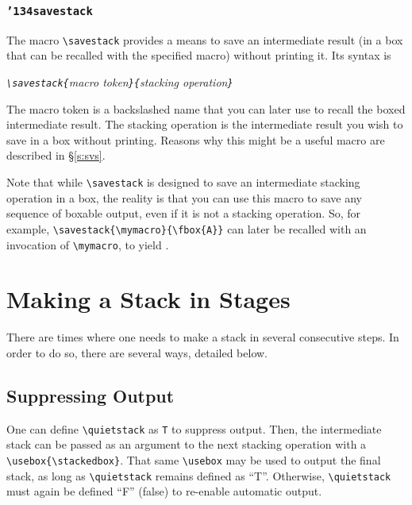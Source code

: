 \documentclass{article}
\let\vb\verb
\newcommand\cmd[1]{\texttt{\char'134#1}}
\begin{document}
{\centering{}\par}

\hsmash{\rule{5ex}{1ex}}\hfill\hsmash{\rule{2ex}{0ex}\rule{5em}{1ex}}

\subsubsection{\cmd{savestack}\label{s:ss}}

The macro \vb|\savestack| provides a means to save an intermediate
result (in a box that can be recalled with the specified macro) without
printing it.  Its syntax is

\itshape
\vb|\savestack{|macro token\vb|}{|stacking operation\vb|}|
\upshape

The macro token is a backslashed name that you can later use to recall
the boxed intermediate result.  The stacking operation is the
intermediate result you wish to save in a box without printing.  Reasons
why this might be a useful macro are described in \S\ref{s:svs}.

Note that while \vb|\savestack| is designed to save an intermediate
stacking operation in a box, the reality is that you can use this macro
to save any sequence of boxable output, even if it is not a stacking
operation.  So, for example, \vb|\savestack{\mymacro}{\fbox{A}}| can
later be recalled with an invocation of \vb|\mymacro|, to yield
\fboxsep=1pt\mymacro.\fboxsep=0pt

\section{Making a Stack in Stages}

There are times where one needs to make a stack in several consecutive
steps.  In order to do so, there are several ways, detailed below.  

\subsection{Suppressing Output\label{s:qs}}

One can define \vb|\quietstack| as \vb|T| to suppress output.  Then, the
intermediate stack can be passed as an argument to the next stacking
operation with a \vb|\usebox{\stackedbox}|.  That same \vb|\usebox|
may be used to output the final stack, as long as \vb|\quietstack|
remains defined as ``T''.  Otherwise, \vb|\quietstack| must again be
defined ``F'' (false) to re-enable automatic output.
\end{document}
